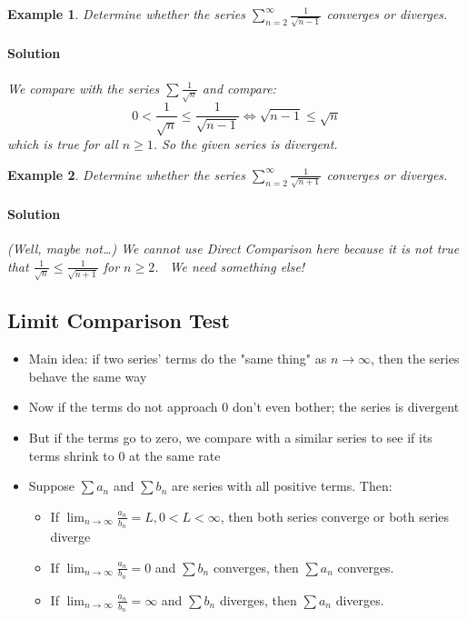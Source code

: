 \documentclass[letterpaper, 11pt, openany]{book}
\theoremstyle{mytheoremstyle}
\theoremstyle{myexamplestyle}
\newtheorem{example}{Example}[section]
\newenvironment{solution}{\paragraph{\sffamily \smaller \fontseries{b}\selectfont Solution}}{\hfill\faSquare}
\begin{document}
\begin{example}\label{e:seriescomptestdiv}
    Determine whether the series $\displaystyle \sum_{n=2}^{\infty} \frac{1}{\sqrt{n - 1}}$ converges or diverges.
    
    \begin{solution}
        We compare with the series $\sum \frac{1}{\sqrt{n}}$ and compare:
        \[0 < \frac{1}{\sqrt{n}} \leq \frac{1}{\sqrt{n - 1}} \Leftrightarrow \sqrt{n - 1} \leq \sqrt{n}\]
        which is true for all $n \geq 1$. So the given series is divergent.
    \end{solution}
\end{example}

\begin{example}\label{e:seriescomptestfail}
    Determine whether the series $\displaystyle \sum_{n=2}^{\infty} \frac{1}{\sqrt{n + 1}}$ converges or diverges.
    
    \begin{solution}
        (Well, maybe not\dots) We cannot use Direct Comparison here because it is \textit{not} true that $\displaystyle \frac{1}{\sqrt{n}} \leq \frac{1}{\sqrt{n + 1}}$ for $n \geq 2$. \faFrown \ We need something else!
    \end{solution}
\end{example}

\subsection{Limit Comparison Test}
\begin{itemize}
    \item Main idea: if two series' terms do the "same thing" as $n \to \infty$, then the series behave the same way
    \item Now if the terms do not approach 0 don't even bother; the series is divergent
    \item But if the terms go to zero, we compare with a similar series to see if its terms shrink to 0 at the same rate
    \item Suppose $\sum a_{n}$ and $\sum b_{n}$ are series with all positive terms. Then:
    \begin{itemize}
        \item If $\displaystyle \lim_{n \to \infty} \frac{a_{n}}{b_{n}} = L, 0 < L < \infty$, then both series converge or both series diverge
        \item If $\displaystyle \lim_{n \to \infty} \frac{a_{n}}{b_{n}} = 0$ and $\sum b_{n}$ converges, then $\sum a_{n}$ converges.
        \item If $\displaystyle \lim_{n \to \infty} \frac{a_{n}}{b_{n}} = \infty$ and $\sum b_{n}$ diverges, then $\sum a_{n}$ diverges.
    \end{itemize}
\end{itemize}
\end{document}
